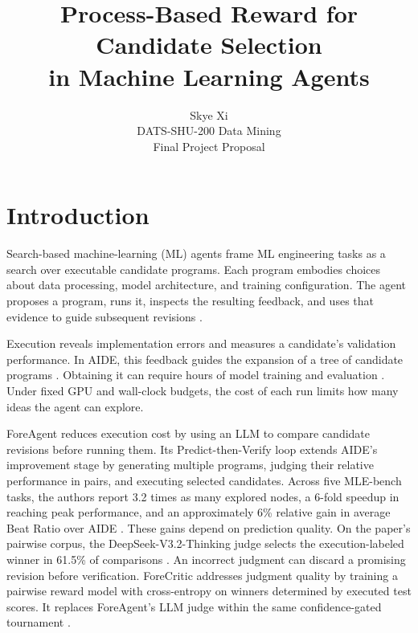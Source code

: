 \documentclass{article}
\title{Process-Based Reward for Candidate Selection\\in Machine Learning Agents}
\author{Skye Xi\\DATS-SHU-200 Data Mining\\Final Project Proposal}
\begin{document}
\maketitle
\raggedbottom

\section{Introduction}

Search-based machine-learning (ML) agents frame ML engineering tasks as a search over executable candidate programs. Each program embodies choices about data processing, model architecture, and training configuration. The agent proposes a program, runs it, inspects the resulting feedback, and uses that evidence to guide subsequent revisions \citep{jiang2025aide}.

Execution reveals implementation errors and measures a candidate's validation performance. In AIDE, this feedback guides the expansion of a tree of candidate programs \citep{jiang2025aide}. Obtaining it can require hours of model training and evaluation \citep[Section~2.2]{zheng2026predict}. Under fixed GPU and wall-clock budgets, the cost of each run limits how many ideas the agent can explore.

ForeAgent reduces execution cost by using an LLM to compare candidate revisions before running them. Its Predict-then-Verify loop extends AIDE's improvement stage by generating multiple programs, judging their relative performance in pairs, and executing selected candidates. Across five MLE-bench tasks, the authors report 3.2 times as many explored nodes, a 6-fold speedup in reaching peak performance, and an approximately 6\% relative gain in average Beat Ratio over AIDE \citep[Section~6]{zheng2026predict}. These gains depend on prediction quality. On the paper's pairwise corpus, the DeepSeek-V3.2-Thinking judge selects the execution-labeled winner in 61.5\% of comparisons \citep[Table~2]{zheng2026predict}. An incorrect judgment can discard a promising revision before verification. ForeCritic addresses judgment quality by training a pairwise reward model with cross-entropy on winners determined by executed test scores. It replaces ForeAgent's LLM judge within the same confidence-gated tournament \citep[Sections~4.2--4.3]{lee2026forecritic}.
\end{document}
